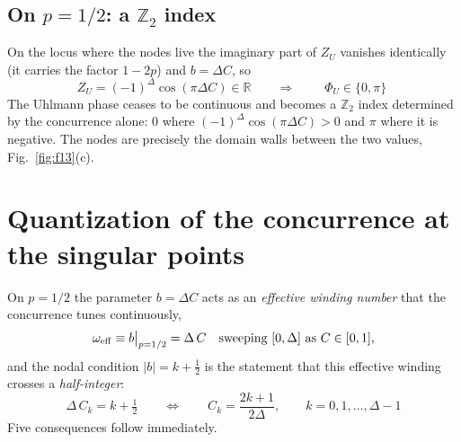\documentclass[11pt]{article}
\begin{document}
\subsection{On $p=1/2$: a $\mathbb{Z}_2$ index}

On the locus where the nodes live the imaginary part of $Z_U$ vanishes
identically (it carries the factor $1-2p$) and $b=\Delta C$, so
\begin{equation}
Z_U=(-1)^{\Delta}\cos(\pi\Delta C)\in\mathbb R
\qquad\Longrightarrow\qquad
\boxed{\;\Phi_U\in\{0,\pi\}\;}
\label{eq:Z2}
\end{equation}
The Uhlmann phase ceases to be continuous and becomes a $\mathbb{Z}_2$ index
determined by the concurrence alone: $0$ where
$(-1)^\Delta\cos(\pi\Delta C)>0$ and $\pi$ where it is negative. The nodes are
precisely the domain walls between the two values,
Fig.~\ref{fig:f13}(c).

\section{Quantization of the concurrence at the singular points}
\label{sec:quantization}

On $p=1/2$ the parameter $b=\Delta C$ acts as an \emph{effective winding
number} that the concurrence tunes continuously,
\begin{equation}
\omega_{\rm eff}\equiv b\big|_{p=1/2}=\Delta\,C
\quad\text{sweeping }[0,\Delta]\text{ as }C\in[0,1],
\end{equation}
and the nodal condition $|b|=k+\frac12$ is the statement that this effective
winding crosses a \emph{half-integer}:
\begin{equation}
\boxed{\;\Delta\,C_k=k+\tfrac12
\qquad\Longleftrightarrow\qquad
C_k=\frac{2k+1}{2\Delta},\qquad k=0,1,\dots,\Delta-1\;}
\label{eq:quantization}
\end{equation}
Five consequences follow immediately.
\end{document}
